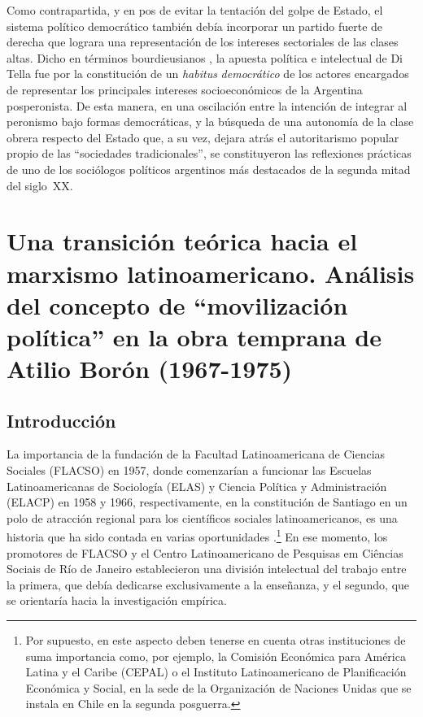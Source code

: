 Como contrapartida, y en pos de evitar la tentación del golpe de Estado, el sistema político democrático también debía incorporar un partido fuerte de derecha que lograra una representación de los intereses sectoriales de las clases altas. Dicho en términos bourdieusianos \parencite{1579-BOURDIEU2007}, la apuesta política e intelectual de Di Tella fue por la constitución de un \emph{habitus} \emph{democrático} de los actores encargados de representar los principales intereses socioeconómicos de la Argentina posperonista. De esta manera, en una oscilación entre la intención de integrar al peronismo bajo formas democráticas, y la búsqueda de una autonomía de la clase obrera respecto del Estado que, a su vez, dejara atrás el autoritarismo popular propio de las \enquote{sociedades tradicionales}, se constituyeron las reflexiones prácticas de uno de los sociólogos políticos argentinos más destacados de la segunda mitad del siglo~XX.

\chapter[Una transición teórica hacia el marxismo latinoamericano. Análisis del concepto de \enquote{movilización política} en la obra temprana de Atilio Borón (1967-1975)]{Una transición teórica hacia el marxismo latinoamericano. Análisis del concepto de \enquote{movilización política} en la obra temprana de Atilio Borón (1967-1975)}

\section{Introducción}

La importancia de la fundación de la Facultad Latinoamericana de Ciencias Sociales (FLACSO) en 1957, donde comenzarían a funcionar las Escuelas Latinoamericanas de Sociología (ELAS) y Ciencia Política y Administración (ELACP) en 1958 y 1966, respectivamente, en la constitución de Santiago en un polo de atracción regional para los científicos sociales latinoamericanos, es una historia que ha sido contada en varias oportunidades \parencite{1523-BEIGEL2009,1538-PEREZBRIGNOLI2008,1625-FRANCO2007,1679-GOMEZDEBENITO2022}.\footnote{Por supuesto, en este aspecto deben tenerse en cuenta otras instituciones de suma importancia como, por ejemplo, la Comisión Económica para América Latina y el Caribe (CEPAL) o el Instituto Latinoamericano de Planificación Económica y Social, en la sede de la Organización de Naciones Unidas que se instala en Chile en la segunda posguerra.} En ese momento, los promotores de FLACSO y el Centro Latinoamericano de Pesquisas em Ciências Sociais de Río de Janeiro establecieron una división intelectual del trabajo entre la primera, que debía dedicarse exclusivamente a la enseñanza, y el segundo, que se orientaría hacia la investigación empírica.

